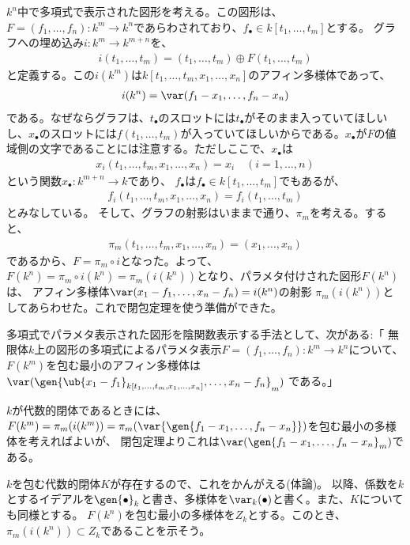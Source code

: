 $k^n$中で多項式で表示された図形を考える。この図形は、$F=(f_1,\dots,f_n)\colon k^m \to k^n$であらわされており、$f_\bullet \in k[t_1,\dots,t_m]$とする。
グラフへの埋め込み$i\colon k^m \to k^{m+n}$を、
\begin{align}
  i(t_1,\dots,t_m) = (t_1,\dots,t_m)\oplus F(t_1,\dots,t_m)
\end{align}
と定義する。この$i(k^m)$は$k[t_1,\dots,t_m,x_1,\dots,x_n]$のアフィン多様体であって、
\begin{align}
  i(k^n) = \var(f_1-x_1,\dots,f_n-x_n)
\end{align}
である。なぜならグラフは、$t_\bullet$のスロットには$t_\bullet$がそのまま入っていてほしいし、$x_\bullet$のスロットには$f(t_1,\dots,t_m)$が入っていてほしいからである。$x_\bullet$が$F$の値域側の文字であることには注意する。ただしここで、$x_\bullet$は
\begin{align}
  x_i(t_1,\dots,t_m,x_1,\dots,x_n) = x_i \quad (i=1,\dots,n)
\end{align}
という関数$x_\bullet \colon k^{m+n} \to k$であり、
$f_\bullet$は$f_\bullet \in k[t_1,\dots,t_m]$でもあるが、
\begin{align}
  f_i(t_1,\dots,t_m,x_1,\dots,x_n) = f_i(t_1,\dots,t_m)
\end{align}
とみなしている。
そして、グラフの射影はいままで通り、$\pi_m$を考える。すると、
\begin{align}
  \pi_m(t_1,\dots,t_m,x_1,\dots,x_n) = (x_1,\dots,x_n)
\end{align}
であるから、$F=\pi_m\circ i$となった。よって、$F(k^n) = \pi_m\circ i(k^n)=\pi_m(i(k^n))$となり、パラメタ付けされた図形$F(k^n)$は、
アフィン多様体$\var(x_1-f_1,\dots,x_n-f_n)=i(k^n)$の射影
$\pi_m(i(k^n))$としてあらわせた。これで閉包定理を使う準備ができた。

多項式でパラメタ表示された図形を陰関数表示する手法として、次がある:「
無限体$k$上の図形の多項式によるパラメタ表示$F=(f_1,\dots,f_n)\colon k^m \to k^n$について、$F(k^m)$を包む最小のアフィン多様体は$\var(\gen{\ub{x_1-f_1}_{k[t_1,\dots,t_m,x_1,\dots,x_n]},\dots,x_n-f_n}_m)$
である。」
\begin{myproof}
$k$が代数的閉体であるときには、$F(k^m) = \pi_m(i(k^m)) = \pi_m(\var{\gen{f_1-x_1,\dots,f_n-x_n}})$を包む最小の多様体を考えればよいが、
閉包定理よりこれは$\var(\gen{f_1-x_1,\dots,f_n-x_n}_m)$である。

$k$を包む代数的閉体$K$が存在するので、これをかんがえる(体論)。
以降、係数を$k$とするイデアルを$\gen{\bullet}_k$と書き、多様体を$\var_k(\bullet)$と書く。また、$K$についても同様とする。
$F(k^n)$を包む最小の多様体を$Z_k$とする。このとき、$\pi_m(i(k^n)) \subset Z_k$であることを示そう。
\end{myproof}
